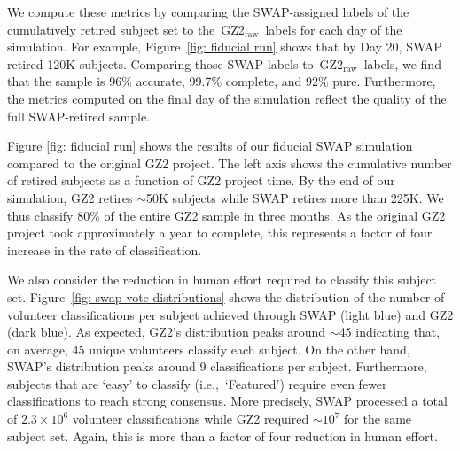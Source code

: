 \documentclass[twocolumn]{aastex6}
\newcommand{\feat}{`Featured'}
\newcommand{\raw}{GZ2$_{\text{raw}}$}
\begin{document}
We compute these metrics by comparing the SWAP-assigned labels of
the cumulatively retired subject set  to the~\raw~labels for each day of
the simulation. 
For example, Figure~\ref{fig: fiducial run} shows that by Day 20, 
SWAP retired 120K subjects. Comparing those SWAP labels to~\raw~labels, 
we find that the sample is 96\% accurate, 99.7\% complete, and 92\% pure. 
Furthermore, the metrics computed on the final day of the simulation
reflect the quality of the full SWAP-retired sample. 

Figure \ref{fig: fiducial run} shows the results of our fiducial SWAP simulation
compared to the original GZ2 project. The left axis shows the cumulative
number of retired subjects as a function of GZ2 project time. 
By the end of our simulation, GZ2 retires $\sim$50K subjects while SWAP retires 
more than 225K. 
We thus classify 80\% of the entire GZ2 sample in three months. 
As the original GZ2 project took approximately a year to complete, this
represents a factor of four increase in the rate of classification. 

We also consider the reduction in human effort required to classify
this subject set. Figure~\ref{fig: swap vote distributions} shows the 
distribution of the number of volunteer classifications per subject 
achieved through SWAP (light blue) and GZ2 (dark blue). 
As expected, GZ2's distribution peaks around $\sim$45 indicating that, on average,
45 unique volunteers classify each subject. On the other hand, SWAP's
distribution peaks around 9 classifications per subject. 
Furthermore, subjects that are `easy' to classify (i.e.,~\feat) require
even fewer classifications to reach strong consensus. 
More precisely, SWAP processed a total of $2.3 \times 10^6$ volunteer 
classifications while GZ2 required $\sim$$10^7$ for the same subject set. 
Again, this is more than a factor of four reduction in human effort. 


\end{document}

